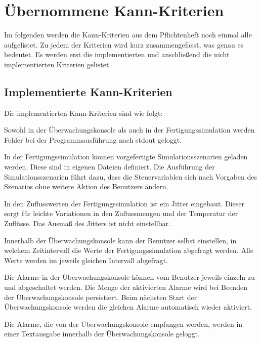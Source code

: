 \documentclass[parskip=full]{scrartcl}
\begin{document}
\section{\"Ubernommene Kann-Kriterien}
Im folgenden werden die Kann-Kriterien aus dem Pflichtenheft noch einmal alle aufgelistet. Zu jedem der Kriterien wird
kurz zusammengefasst, was genau es bedeutet. Es werden erst die implementierten und anschlie{\ss}end die nicht implementierten
Kriterien gelistet.

\subsection{Implementierte Kann-Kriterien}
Die implementierten Kann-Kriterien sind wie folgt:

Sowohl in der \"Uberwachungskonsole als auch in der Fertigungssimulation werden Fehler bei der Programmausf\"uhrung nach
stdout geloggt.

In der Fertigungssimulation k\"onnen vorgefertigte Simulationsszenarien geladen werden. Diese sind in eigenen Dateien definiert.
Die Ausführung der Simulationsszenarien f\"uhrt dazu, dass die Steuervariablen sich nach Vorgaben des Szenarios ohne
weitere Aktion des Benutzers \"andern.

In den Zuflusswerten der Fertigungssimulation ist ein Jitter eingebaut. Dieser sorgt f\"ur leichte Variationen in den
Zuflussmengen und der Temperatur der Zufl\"usse. Das Ausma{\ss} des Jitters ist nicht einstellbar.

Innerhalb der \"Uberwachungskonsole kann der Benutzer selbst einstellen, in welchem Zeitintervall die Werte der
Fertigungssimulation abgefragt werden. Alle Werte werden im jeweils gleichen Intervall abgefragt.

Die Alarme in der \"Uberwachungskonsole k\"onnen vom Benutzer jeweils einzeln zu- und abgeschaltet werden. Die Menge der
aktivierten Alarme wird bei Beenden der \"Uberwachungskonsole persistiert. Beim n\"achsten Start der \"Uberwachungskonsole
werden die gleichen Alarme automatisch wieder aktiviert.

Die Alarme, die von der \"Uberwachungskonsole empfangen werden, werden in einer Textausgabe innerhalb der \"Uberwachungskonsole
geloggt.

\end{document}
